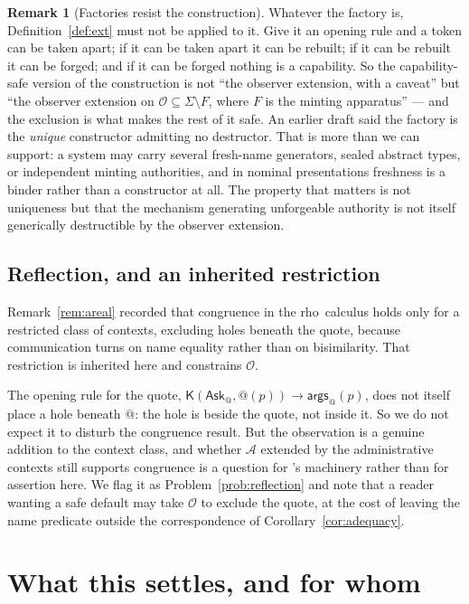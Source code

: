 \documentclass[11pt]{article}
\theoremstyle{plain}
\theoremstyle{definition}
\newtheorem{remark}[theorem]{Remark}
\newcommand{\rhoc}{\textsf{rho}}
\newcommand{\Kc}{\mathsf{K}}
\newcommand{\Ask}{\mathsf{Ask}}
\newcommand{\args}{\mathsf{args}}
\newcommand{\Ob}{\mathcal{O}}
\begin{document}
\begin{remark}[Factories resist the construction]
\label{rem:nodestructor}
Whatever the factory is, Definition~\ref{def:ext} must not be applied to it. Give it an opening rule and
a token can be taken apart; if it can be taken apart it can be rebuilt; if it can be rebuilt it can be
forged; and if it can be forged nothing is a capability. So the capability-safe version of the
construction is not ``the observer extension, with a caveat'' but ``the observer extension on
$\Ob \subseteq \Sigma \setminus F$, where $F$ is the minting apparatus'' --- and the exclusion is what
makes the rest of it safe. An earlier draft said the factory is the \emph{unique} constructor admitting
no destructor. That is more than we can support: a system may carry several fresh-name generators,
sealed abstract types, or independent minting authorities, and in nominal presentations freshness is a
binder rather than a constructor at all. The property that matters is not uniqueness but that the
mechanism generating unforgeable authority is not itself generically destructible by the observer
extension.
\end{remark}

\subsection{Reflection, and an inherited restriction}
\label{sec:reflection}

Remark~\ref{rem:areal} recorded that congruence in the \rhoc\ calculus holds only for a restricted class
of contexts, excluding holes beneath the quote, because communication turns on name equality rather than
on bisimilarity. That restriction is inherited here and constrains $\Ob$.

The opening rule for the quote, $\Kc(\Ask_@, @(p)) \to \args_@(p)$, does not itself place a hole beneath
$@$: the hole is beside the quote, not inside it. So we do not expect it to disturb the congruence
result. But the observation is a genuine addition to the context class, and whether $\mathcal{A}$
extended by the administrative contexts still supports congruence is a question for \cite{BIHOL}'s
machinery rather than for assertion here. We flag it as Problem~\ref{prob:reflection} and note that a
reader wanting a safe default may take $\Ob$ to exclude the quote, at the cost of leaving the name
predicate outside the correspondence of Corollary~\ref{cor:adequacy}.

\section{What this settles, and for whom}
\label{sec:settles}
\end{document}

